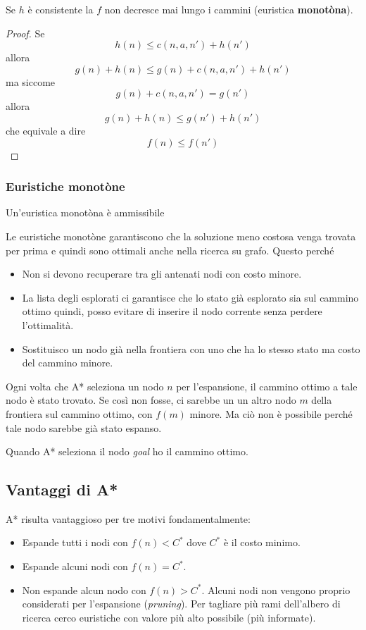 \begin{theorem}
	Se $h$ \`e consistente la $f$ non decresce mai lungo i cammini (euristica
	\textbf{monot\`ona}).
	\begin{proof}
		Se \[ h(n) \leq c(n, a, n') + h(n') \] allora
		\[ g(n) + h(n) \leq g(n) + c(n, a, n') + h(n') \]
		ma siccome
		\[ g(n) + c(n, a, n') = g(n') \] allora
		\[ g(n) + h(n) \leq g(n') + h(n') \] che equivale a dire
		\[ f(n) \leq f(n') \]
	\end{proof}
\end{theorem}

\subsubsection{Euristiche monot\`one}
\begin{theorem}
	Un'euristica monot\`ona \`e ammissibile
\end{theorem}
Le euristiche monot\`one garantiscono che la soluzione meno costosa venga trovata per prima
e quindi sono ottimali anche nella ricerca su grafo. Questo perch\'e
\begin{itemize}
	\item Non si devono recuperare tra gli antenati nodi con costo minore.
	\item La lista degli esplorati ci garantisce che lo stato gi\`a esplorato sia sul cammino
	      ottimo quindi, posso evitare di inserire il nodo corrente senza perdere
	      l'ottimalit\`a.
	\item Sostituisco un nodo gi\`a nella frontiera con uno che ha lo stesso stato ma costo
	      del cammino minore.
\end{itemize}
Ogni volta che A* seleziona un nodo $n$ per l'espansione, il cammino ottimo a tale nodo \`e stato
trovato. Se cos\`i non fosse, ci sarebbe un un altro nodo $m$ della frontiera sul cammino
ottimo, con $f(m)$ minore. Ma ci\`o non \`e possibile perch\'e tale nodo sarebbe gi\`a stato
espanso.

Quando A* seleziona il nodo \emph{goal} ho il cammino ottimo.

\subsection{Vantaggi di A*}
A* risulta vantaggioso per tre motivi fondamentalmente:
\begin{itemize}
	\item Espande tutti i nodi con $f(n) < C^*$ dove $C^*$ \`e il costo minimo.
	\item Espande alcuni nodi con $f(n) = C^*$.
	\item Non espande alcun nodo con $f(n) > C^*$. Alcuni nodi non vengono proprio considerati
	      per l'espansione (\emph{pruning}). Per tagliare pi\`u rami dell'albero di ricerca cerco
	      euristiche con valore pi\`u alto possibile (pi\`u informate).
\end{itemize}

